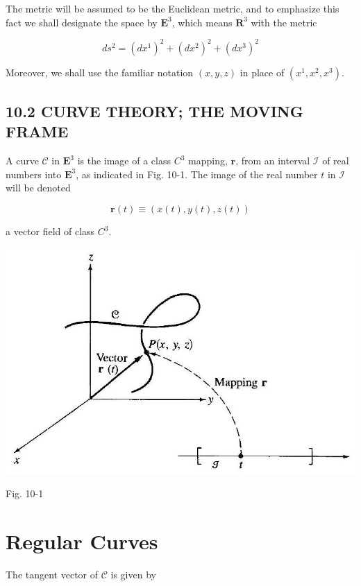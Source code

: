 \documentclass[10pt]{article}
\begin{document}
The metric will be assumed to be the Euclidean metric, and to emphasize this fact we shall designate the space by $\mathbf{E}^{3}$, which means $\mathbf{R}^{3}$ with the metric

$$
d s^{2}=\left(d x^{1}\right)^{2}+\left(d x^{2}\right)^{2}+\left(d x^{3}\right)^{2}
$$

Moreover, we shall use the familiar notation $(x, y, z)$ in place of $\left(x^{1}, x^{2}, x^{3}\right)$.

\subsection*{10.2 CURVE THEORY; THE MOVING FRAME}
A curve $\mathscr{C}$ in $\mathbf{E}^{3}$ is the image of a class $C^{3}$ mapping, $\mathbf{r}$, from an interval $\mathscr{I}$ of real numbers into $\mathbf{E}^{3}$, as indicated in Fig. 10-1. The image of the real number $t$ in $\mathscr{I}$ will be denoted


\begin{equation*}
\mathbf{r}(t) \equiv(x(t), y(t), z(t)) \tag{10.1}
\end{equation*}


a vector field of class $C^{3}$.

\begin{center}
\includegraphics[max width=\textwidth]{2024_04_03_41f90be4f896e21f0dc9g-136}
\end{center}

Fig. 10-1

\section*{Regular Curves}
The tangent vector of $\mathscr{C}$ is given by
\end{document}
